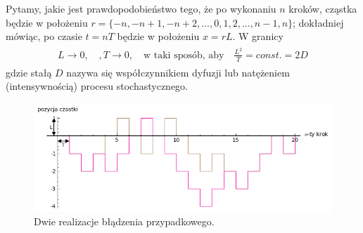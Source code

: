 \documentclass[a4paper,12pt,polish]{sphinxmanual}
\begin{document}
Pytamy, jakie jest prawdopodobieństwo tego, że po wykonaniu $n$ kroków, cząstka będzie w położeniu $r = \{-n, -n+1, -n+2,..., 0, 1, 2,..., n-1, n\}$; dokładniej mówiąc, po czasie $t=nT$ będzie w położeniu $x=rL$. W granicy
\label{ch3/chIII021:equation-eqn6}\begin{gather}
\begin{split}L\to 0, \quad, T\to 0, \quad \mbox{w taki sposób, aby} \quad \frac{L^2}{T} = const. = 2D\end{split}\label{ch3/chIII021-eqn6}
\end{gather}
gdzie stałą $D$ nazywa się współczynnikiem dyfuzji lub natężeniem (intensywnością) procesu stochastycznego.
\begin{figure}[htbp]
\centering
\capstart

\includegraphics[width=0.800\linewidth]{brownian_walk.png}
\caption{Dwie realizacje błądzenia przypadkowego.}\end{figure}
\end{document}
